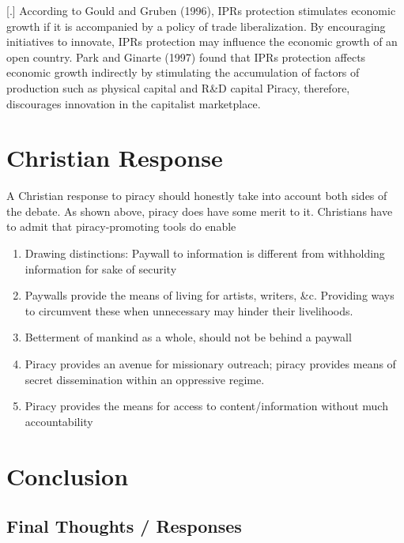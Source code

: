 \documentclass[onecolumn, 12pt]{article}
\begin{document}
[.]{%
  According to Gould and Gruben (1996), IPRs protection stimulates economic
  growth if it is accompanied by a policy of trade liberalization. By
  encouraging initiatives to innovate, IPRs protection may influence the
  economic growth of an open country. Park and Ginarte (1997) found that IPRs
  protection affects economic growth indirectly by stimulating the accumulation
  of factors of production such as physical capital and R\&D capital%
}
Piracy, therefore, discourages innovation in the capitalist marketplace.

\section{Christian Response}
A Christian response to piracy should honestly take into account both sides of
the debate. As shown above, piracy does have some merit to it. Christians have
to admit that piracy-promoting tools do enable 


\begin{enumerate}
  \item Drawing distinctions: Paywall to information is different from
    withholding information for sake of security

  \item Paywalls provide the means of living for artists, writers, \&c. Providing
    ways to circumvent these when unnecessary may hinder their livelihoods.

  \item Betterment of mankind as a whole, should not be behind a paywall

  \item Piracy provides an avenue for missionary outreach; piracy provides
    means of secret dissemination within an oppressive regime.

  \item Piracy provides the means for access to content/information without
    much accountability
\end{enumerate}

\section{Conclusion}

\subsection{Final Thoughts / Responses}
\end{document}
